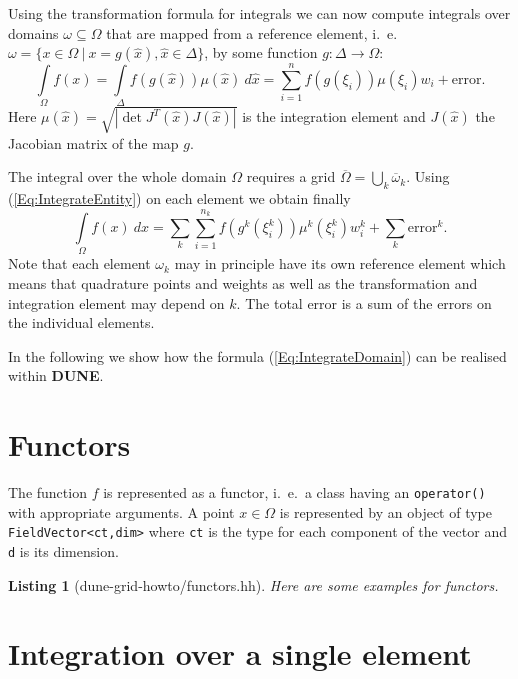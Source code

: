 \documentclass[11pt,a4paper,headinclude,footinclude,DIV16,normalheadings]{scrreprt}
\newcommand{\Dune}{{\sf\bfseries DUNE}\xspace}
\newtheorem{lst}{Listing}
\begin{document}
Using the transformation formula for integrals we can now compute
integrals over domains $\omega\subseteq\Omega$ that are mapped from a
reference element, i.~e.~$\omega=\{x\in\Omega\ |\
x=g(\hat{x}), \hat{x}\in\Delta\}$, by some function $g:\Delta\to\Omega$:
\begin{equation}
\int\limits_{\Omega} f(x) = \int\limits_{\Delta} f(g(\hat{x}))\mu(\hat{x})\
d\hat{x} = \sum_{i=1}^n f(g(\xi_i))\mu(\xi_i)w_i + \text{error}. 
\label{Eq:IntegrateEntity}
\end{equation}
Here $\mu(\hat{x}) = \sqrt{|\det J^T(\hat{x})J(\hat{x})|}$ is the
integration element and $J(\hat{x})$ the Jacobian matrix of the map $g$.

The integral over the whole domain $\Omega$ requires a grid
$\overline{\Omega}=\bigcup_k \overline{\omega}_k$. Using
(\ref{Eq:IntegrateEntity}) on each element we obtain finally
\begin{equation}
\int\limits_{\Omega} f(x)\ dx = \sum\limits_{k} \sum_{i=1}^{n_k}
f(g^k(\xi^k_i))\mu^k(\xi^k_i)w^k_i + \sum\limits_{k} \text{error}^k.
\label{Eq:IntegrateDomain}
\end{equation}
Note that each element $\omega_k$ may in principle have its own
reference element which means that quadrature points and weights as
well as the transformation and integration element may depend on
$k$. The total error is a sum of the errors on the individual
elements. 

In the following we show how the formula (\ref{Eq:IntegrateDomain})
can be realised within \Dune.


\section{Functors}

The function $f$ is represented as a functor, i.~e.~a class having an
\lstinline!operator()! with appropriate arguments. A point
$x\in\Omega$ is represented by an object of type
\lstinline!FieldVector<ct,dim>! where \lstinline!ct! is the type for
each component of the vector and \lstinline!d! is its dimension.


\begin{lst}[dune-grid-howto/functors.hh] Here are some examples for functors.


\end{lst}


\section{Integration over a single element}
\end{document}
